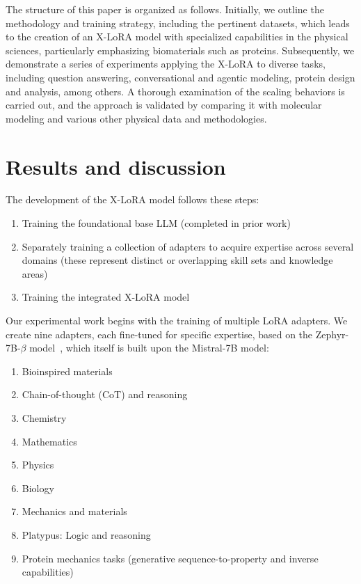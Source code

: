 The structure of this paper is organized as follows. Initially, we outline the methodology and training strategy, including the pertinent datasets, which leads to the creation of an X-LoRA model with specialized capabilities in the physical sciences, particularly emphasizing biomaterials such as proteins. Subsequently, we demonstrate a series of experiments applying the X-LoRA to diverse tasks, including question answering, conversational and agentic modeling, protein design and analysis, among others. A thorough examination of the scaling behaviors is carried out, and the approach is validated by comparing it with molecular modeling and various other physical data and methodologies.

\section{Results and discussion}

The development of the X-LoRA model follows these steps:

\begin{enumerate}
    \item Training the foundational base LLM (completed in prior work) \item Separately training a collection of adapters to acquire expertise across several domains (these represent distinct or overlapping skill sets and knowledge areas) \item Training the integrated X-LoRA model
\end{enumerate}

Our experimental work begins with the training of multiple LoRA adapters. We create nine adapters, each fine-tuned for specific expertise, based on the Zephyr-7B-$\beta$ model~\cite{HuggingFaceH4/zephyr-7b-betaFace}, which itself is built upon the Mistral-7B model\cite{Jiang2023Mistral7B}:

\begin{enumerate}
    \item Bioinspired materials \item Chain-of-thought (CoT) and reasoning \item Chemistry \item Mathematics \item Physics \item Biology \item Mechanics and materials \item Platypus: Logic and reasoning \item Protein mechanics tasks (generative sequence-to-property and inverse capabilities)
\end{enumerate}

